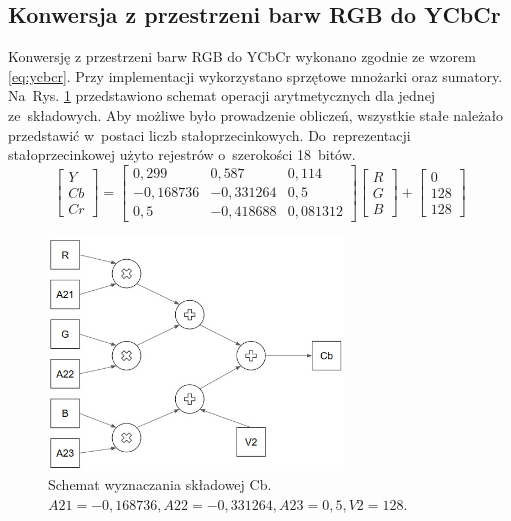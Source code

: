 \subsection{Konwersja z przestrzeni barw RGB do YCbCr}
\label{subsec:konwersja}
Konwersję z przestrzeni barw RGB do YCbCr wykonano zgodnie ze wzorem \ref{eq:ycbcr}. 
Przy implementacji wykorzystano sprzętowe mnożarki oraz sumatory. Na~Rys. \ref{fig:drzewo_ycbcr} przedstawiono schemat operacji arytmetycznych dla jednej ze~składowych. Aby możliwe było prowadzenie obliczeń, wszystkie stałe należało przedstawić w~postaci liczb stałoprzecinkowych. Do~reprezentacji stałoprzecinkowej użyto rejestrów o~szerokości 18~bitów.
\begin{equation}
\label{eq:ycbcr}
\begin{bmatrix} Y \\ 
Cb\\
Cr
\end{bmatrix}=
\begin{bmatrix} 0,299 & 0,587 & 0,114\\ 
-0,168736 & -0,331264 & 0,5\\
0,5 & -0,418688 & 0,081312
\end{bmatrix}
\begin{bmatrix} R\\
G\\
B
\end{bmatrix}+
\begin{bmatrix} 0\\
128\\
128
\end{bmatrix}
\end{equation}

\begin{figure}[h]
	\centering
	\includegraphics[width=0.7\textwidth]{drzewo_ycbcr.jpg}
	\caption{Schemat wyznaczania składowej Cb. $A21=-0,168736, A22=-0,331264, A23=0,5, V2=128$.}
	\label{fig:drzewo_ycbcr}
\end{figure} 

